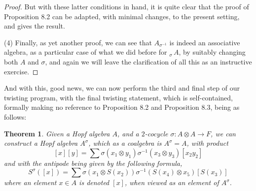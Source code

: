 \documentclass[12pt]{amsbook}
\newtheorem{theorem}{Theorem}[chapter]
\begin{document}
\begin{proof}
But with these latter conditions in hand, it is quite clear that the proof of Proposition 8.2 can be adapted, with minimal changes, to the present setting, and gives the result.

\medskip

(4) Finally, as yet another proof, we can see that $A_{\sigma^{-1}}$ is indeed an associative algebra, as a particular case of what we did before for $_{\sigma}\!\,A$, by suitably changing both $A$ and $\sigma$, and again we will leave the clarification of all this as an instructive exercise.
\end{proof}

And with this, good news, we can now perform the third and final step of our twisting program, with the final twisting statement, which is self-contained, formally making no reference to Proposition 8.2 and Proposition 8.3, being as follows:


\begin{theorem}
Given a Hopf algebra $A$, and a $2$-cocycle $\sigma:A\otimes A\to F$, we can construct a Hopf algebra $A^\sigma$, which as a coalgebra is $A^\sigma=A$, with product 
$$[x][y]=\sum\sigma(x_1\otimes y_1)\sigma^{-1}(x_3\otimes y_3)[x_2y_2]$$ 
and with the antipode being given by the following formula,
$$S^{\sigma}([x])=\sum\sigma(x_1\otimes S(x_2))\sigma^{-1}(S(x_4)\otimes x_5)[S(x_3)]$$
where an element $x\in A$ is denoted $[x]$, when viewed as an element of $A^{\sigma}$. \end{theorem}
\end{document}
